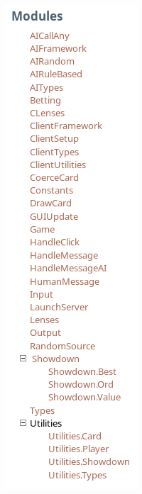 \begin{figure}[H]
    \centering
    \begin{subfigure}[h]{0.4\textwidth}
        \includegraphics[width=0.775\textwidth]{../images/modules.png}

\end{subfigure}
\end{figure}
